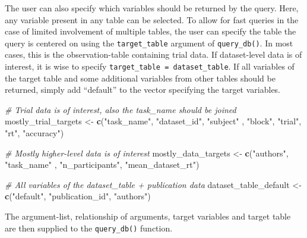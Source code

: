 \documentclass[
  man,floatsintext]{apa6}
\newenvironment{Shaded}{\begin{snugshade}}{\end{snugshade}}
\newcommand{\CommentTok}[1]{\textcolor[rgb]{0.56,0.35,0.01}{\textit{#1}}}
\newcommand{\FunctionTok}[1]{\textcolor[rgb]{0.13,0.29,0.53}{\textbf{#1}}}
\newcommand{\NormalTok}[1]{#1}
\newcommand{\OtherTok}[1]{\textcolor[rgb]{0.56,0.35,0.01}{#1}}
\newcommand{\StringTok}[1]{\textcolor[rgb]{0.31,0.60,0.02}{#1}}
\begin{document}
The user can also specify which variables should be returned by the query. Here, any variable present in any table can be selected. To allow for fast queries in the case of limited involvement of multiple tables, the user can specify the table the query is centered on using the \texttt{target\_table} argument of \texttt{query\_db()}. In most cases, this is the observation-table containing trial data. If dataset-level data is of interest, it is wise to specify \texttt{target\_table\ =\ dataset\_table}. If all variables of the target table and some additional variables from other tables should be returned, simply add ``default'' to the vector specifying the target variables.

\begin{Shaded}
\begin{Highlighting}[]
\CommentTok{\# Trial data is of interest, also the task\_name should be joined}
\NormalTok{mostly\_trial\_targets }\OtherTok{\textless{}{-}} \FunctionTok{c}\NormalTok{(}\StringTok{"task\_name"}\NormalTok{, }\StringTok{"dataset\_id"}\NormalTok{, }\StringTok{"subject"}
\NormalTok{                          , }\StringTok{"block"}\NormalTok{, }\StringTok{"trial"}\NormalTok{, }\StringTok{"rt"}\NormalTok{, }\StringTok{"accuracy"}\NormalTok{)}

\CommentTok{\# Mostly higher{-}level data is of interest}
\NormalTok{mostly\_data\_targets }\OtherTok{\textless{}{-}} \FunctionTok{c}\NormalTok{(}\StringTok{"authors"}\NormalTok{, }\StringTok{"task\_name"}
\NormalTok{                         , }\StringTok{"n\_participants"}\NormalTok{, }\StringTok{"mean\_dataset\_rt"}\NormalTok{)}

\CommentTok{\# All variables of the dataset\_table + publication data}
\NormalTok{dataset\_table\_default }\OtherTok{\textless{}{-}} \FunctionTok{c}\NormalTok{(}\StringTok{"default"}\NormalTok{, }\StringTok{"publication\_id"}\NormalTok{, }\StringTok{"authors"}\NormalTok{)}
\end{Highlighting}
\end{Shaded}

The argument-list, relationship of arguments, target variables and target table are then supplied to the \texttt{query\_db()} function.
\end{document}
